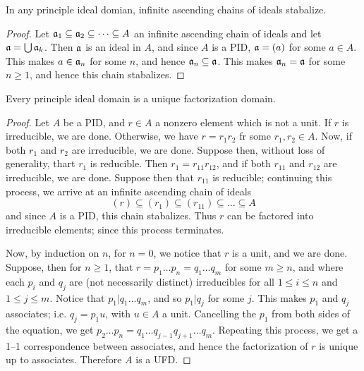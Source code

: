 \begin{lemma}\label{2.3.5}
    In any principle ideal domian, infinite ascending chains of ideals
    stabalize.
\end{lemma}
\begin{proof}
    Let $\mathfrak{a}_1 \subseteq \mathfrak{a}_2 \subseteq \dots \subseteq A$ an infinite ascending
    chain of ideals and let $\mathfrak{a}=\bigcup{\mathfrak{a}_k}$. Then $\mathfrak{a}$ is an ideal in $A$,
    and since  $A$ is a PID,  $\mathfrak{a}=(a)$ for some $a \in A$. This makes  $a \in
    \mathfrak{a}_n$ for some  $n$, and hence  $\mathfrak{a}_n \subseteq \mathfrak{a}$. This makes
    $\mathfrak{a}_n=\mathfrak{a}$ for some $n \geq 1$, and hence this chain stabalizes.
\end{proof}

\begin{theorem}\label{2.3.6}
    Every principle ideal domain is a unique factorization domain.
\end{theorem}
\begin{proof}
    Let $A$ be a PID, and  $r \in A$ a nonzero element which is not a unit. If
    $r$ is irreducible, we are done. Otherwise, we have  $r=r_1r_2$ fr some
    $r_1,r_2 \in A$. Now, if both $r_1$ and $r_2$ are irreducible, we are done.
    Suppose then, without loss of generality, thart $r_1$ is reducible. Then
    $r_1=r_{11}r_{12}$, and if both $r_{11}$ and $r_{12}$ are irreducible, we
    are done. Suppose then that $r_{11}$ is reducible; continuing this process,
    we arrive at an infinite ascending chain of ideals
    \begin{equation*}
        (r) \subseteq (r_1) \subseteq (r_{11}) \subseteq \dots \subseteq A
    \end{equation*}
    and since $A$ is a PID, this chain stabalizes. Thus $r$ can be factored into
    irreducible elements; since this process terminates.

    Now, by induction on $n$, for  $n=0$, we notice that  $r$ is a unit, and we
    are done. Suppose, then for  $n \geq 1$, that  $r=p_1 \dots p_n=q_1 \dots
    q_m$ for some $m \geq n$, and where each  $p_i$ and  $q_j$ are  (not
    necessarily distinct) irreducibles for all $1 \leq i \leq n$ and $1 \leq j
    \leq m$. Notice that  $p_1|q_1 \dots q_m$, and so $p_1|q_j$ for some $j$.
    This makes  $p_1$ and $q_j$ associates; i.e.  $q_j=p_1u$, with $u \in A$ a
    unit. Cancelling the  $p_1$ from both sides of the equation, we get $p_2
    \dots p_n=q_1 \dots q_{j-1}q_{j+1} \dots q_m$. Repeating this process, we
    get a 1--1 correspondence between associates, and hence the factorization of
    $r$ is unique up to associates. Therefore  $A$ is a UFD.
\end{proof}
